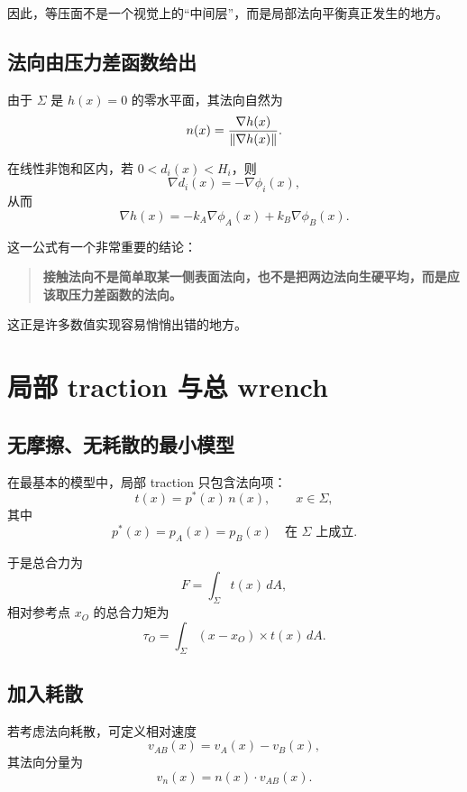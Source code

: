 \documentclass[12pt,a4paper]{ctexart}
\begin{document}
因此，等压面不是一个视觉上的“中间层”，而是局部法向平衡真正发生的地方。

\subsection{法向由压力差函数给出}
由于 $\Sigma$ 是 $h(x)=0$ 的零水平面，其法向自然为
\begin{equation}
    n(x)=\frac{\nabla h(x)}{\norm{\nabla h(x)}}.
\end{equation}

在线性非饱和区内，若 $0<d_i(x)<H_i$，则
\begin{equation}
    \nabla d_i(x)=-\nabla \phi_i(x),
\end{equation}
从而
\begin{equation}
    \nabla h(x)=-k_A\nabla\phi_A(x)+k_B\nabla\phi_B(x).
\end{equation}

这一公式有一个非常重要的结论：
\begin{quote}
\textbf{接触法向不是简单取某一侧表面法向，也不是把两边法向生硬平均，而是应该取压力差函数的法向。}
\end{quote}

这正是许多数值实现容易悄悄出错的地方。

\section{局部 traction 与总 wrench}

\subsection{无摩擦、无耗散的最小模型}
在最基本的模型中，局部 traction 只包含法向项：
\begin{equation}
    t(x)=p^*(x)\,n(x),
    \qquad x\in\Sigma,
\end{equation}
其中
\begin{equation}
    p^*(x)=p_A(x)=p_B(x)\quad \text{在 }\Sigma\text{ 上成立}.
\end{equation}

于是总合力为
\begin{equation}
    F = \int_{\Sigma} t(x)\,dA,
\end{equation}
相对参考点 $x_O$ 的总合力矩为
\begin{equation}
    \tau_O = \int_{\Sigma}(x-x_O)\times t(x)\,dA.
\end{equation}

\subsection{加入耗散}
若考虑法向耗散，可定义相对速度
\begin{equation}
    v_{AB}(x)=v_A(x)-v_B(x),
\end{equation}
其法向分量为
\begin{equation}
    v_n(x)=n(x)\cdot v_{AB}(x).
\end{equation}
\end{document}
